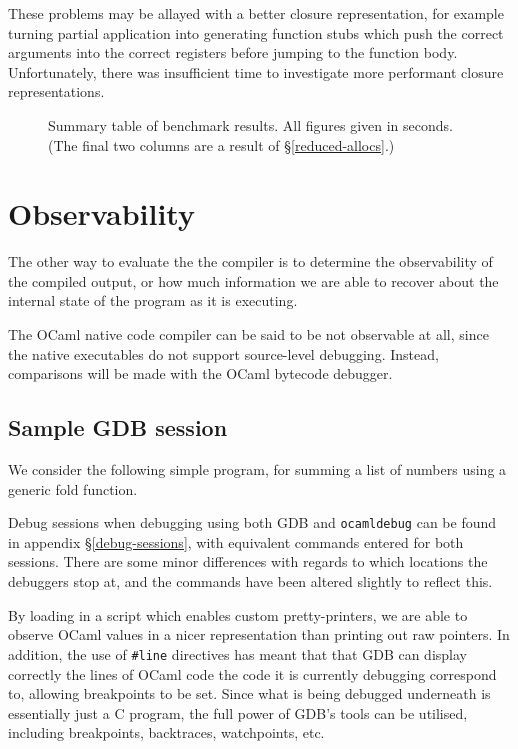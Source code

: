 These problems may be allayed with a better closure representation, for example 
turning partial application into generating function stubs which push the 
correct arguments into the correct registers before jumping to the function 
body. Unfortunately, there was insufficient time to investigate more performant 
closure representations.

\begin{figure}
    \centering
    \resizebox{\textwidth}{!}{
        
    }
    \caption{Summary table of benchmark results. All figures given in 
    seconds. (The final two columns are a result of \S\ref{reduced-allocs}.)}
\end{figure}

\section{Observability} \label{observability}

The other way to evaluate the the compiler is to determine the observability of 
the compiled output, or how much information we are able to recover about the 
internal state of the program as it is executing.

The OCaml native code compiler can be said to be not observable at all, since
the native executables do not support source-level debugging. Instead,
comparisons will be made with the OCaml bytecode debugger.

\subsection{Sample GDB session}

We consider the following simple program, for summing a list of numbers using a 
generic fold function.



Debug sessions when debugging using both GDB and \texttt{ocamldebug} can be
found in appendix \S\ref{debug-sessions}, with equivalent commands entered
for both sessions. There are some minor differences with regards to which
locations the debuggers stop at, and the commands have been altered slightly to
reflect this.

By loading in a script which enables custom pretty-printers, we are able to 
observe OCaml values in a nicer representation than printing out raw pointers. 
In addition, the use of \texttt{\#}\texttt{line} directives has meant that that 
GDB can display correctly the lines of OCaml code the code it is currently 
debugging correspond to, allowing breakpoints to be set. Since what is being 
debugged underneath is essentially just a C program, the full power of GDB's 
tools can be utilised, including breakpoints, backtraces, watchpoints, etc.

